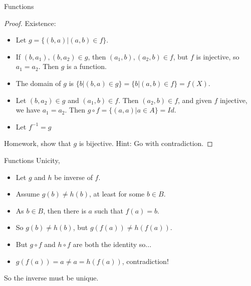\documentclass[aspectratio=169]{beamer}
\begin{document}
\begin{frame}{Functions}
    
    \begin{proof}
    
    Existence:
    
        \begin{itemize}
        
        \item Let $g = \{(b,a)|(a,b)\in f\}$. \pause
        
        \item If $(b,a_1),(b,a_2)\in g$, then $(a_1,b),(a_2,b)\in f$, but $f$ is injective, so $a_1 = a_2$. Then $g$ is a function.\pause
        
        \item The domain of $g$ is $\{b|(b,a)\in g\} = \{b|(a,b)\in f\} = f(X)$.\pause
        
        \item Let $(b,a_2)\in g$ and $(a_1,b)\in f$. Then $(a_2,b)\in f$, and given $f$ injective, we have $a_1=a_2$. Then $g\circ f = \{(a,a)|a\in A\} = Id.$\pause
        
        \item Let $f^{-1} = g$
        
        \end{itemize}
        
        Homework, show that $g$ is bijective. Hint: Go with contradiction.
    \end{proof}
    
\end{frame}

\begin{frame}{Functions}
    Unicity,
    
    \begin{itemize}
        \item Let $g$ and $h$ be inverse of $f$.\pause
        
        \item Assume $g(b)\neq h(b)$, at least for some $b\in B$.\pause
        
        \item As $b\in B$, then there is $a$ such that $f(a)=b$.\pause
        
        \item So $g(b) \neq h(b)$, but $g(f(a)) \neq h(f(a))$.\pause
        
        \item But $g\circ f$ and $h\circ f$ are both the identity so...\pause
        
        \item $g(f(a)) = a \neq a = h(f(a))$, contradiction!
        
    \end{itemize}
    
    So the inverse must be unique.
    
\end{frame}
\end{document}
